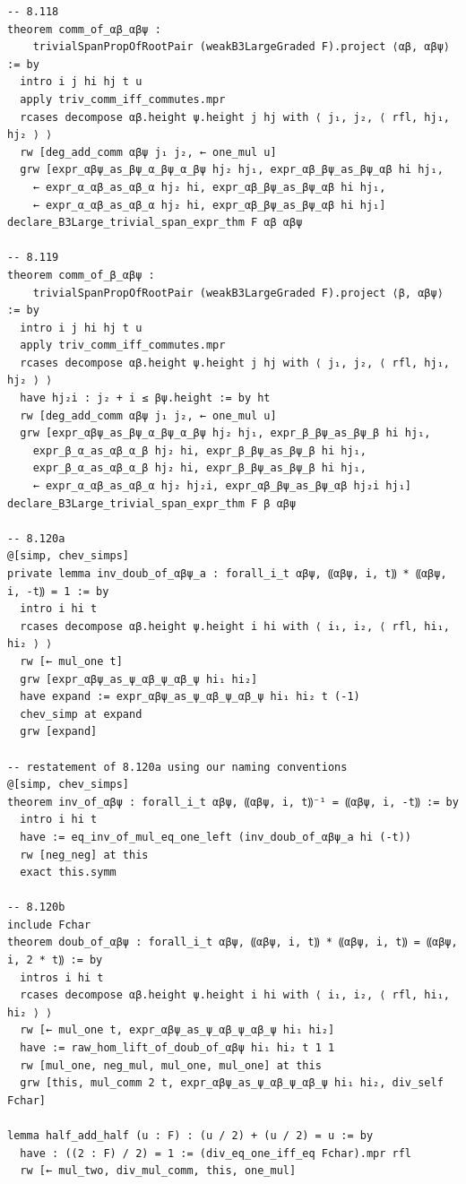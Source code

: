 \begin{Verbatim}
-- 8.118
theorem comm_of_αβ_αβψ :
    trivialSpanPropOfRootPair (weakB3LargeGraded F).project ⟨αβ, αβψ⟩ := by
  intro i j hi hj t u
  apply triv_comm_iff_commutes.mpr
  rcases decompose αβ.height ψ.height j hj with ⟨ j₁, j₂, ⟨ rfl, hj₁, hj₂ ⟩ ⟩
  rw [deg_add_comm αβψ j₁ j₂, ← one_mul u]
  grw [expr_αβψ_as_βψ_α_βψ_α_βψ hj₂ hj₁, expr_αβ_βψ_as_βψ_αβ hi hj₁,
    ← expr_α_αβ_as_αβ_α hj₂ hi, expr_αβ_βψ_as_βψ_αβ hi hj₁,
    ← expr_α_αβ_as_αβ_α hj₂ hi, expr_αβ_βψ_as_βψ_αβ hi hj₁]
declare_B3Large_trivial_span_expr_thm F αβ αβψ

-- 8.119
theorem comm_of_β_αβψ :
    trivialSpanPropOfRootPair (weakB3LargeGraded F).project ⟨β, αβψ⟩ := by
  intro i j hi hj t u
  apply triv_comm_iff_commutes.mpr
  rcases decompose αβ.height ψ.height j hj with ⟨ j₁, j₂, ⟨ rfl, hj₁, hj₂ ⟩ ⟩
  have hj₂i : j₂ + i ≤ βψ.height := by ht
  rw [deg_add_comm αβψ j₁ j₂, ← one_mul u]
  grw [expr_αβψ_as_βψ_α_βψ_α_βψ hj₂ hj₁, expr_β_βψ_as_βψ_β hi hj₁,
    expr_β_α_as_αβ_α_β hj₂ hi, expr_β_βψ_as_βψ_β hi hj₁,
    expr_β_α_as_αβ_α_β hj₂ hi, expr_β_βψ_as_βψ_β hi hj₁,
    ← expr_α_αβ_as_αβ_α hj₂ hj₂i, expr_αβ_βψ_as_βψ_αβ hj₂i hj₁]
declare_B3Large_trivial_span_expr_thm F β αβψ

-- 8.120a
@[simp, chev_simps]
private lemma inv_doub_of_αβψ_a : forall_i_t αβψ, ⸨αβψ, i, t⸩ * ⸨αβψ, i, -t⸩ = 1 := by
  intro i hi t
  rcases decompose αβ.height ψ.height i hi with ⟨ i₁, i₂, ⟨ rfl, hi₁, hi₂ ⟩ ⟩
  rw [← mul_one t]
  grw [expr_αβψ_as_ψ_αβ_ψ_αβ_ψ hi₁ hi₂]
  have expand := expr_αβψ_as_ψ_αβ_ψ_αβ_ψ hi₁ hi₂ t (-1)
  chev_simp at expand
  grw [expand]

-- restatement of 8.120a using our naming conventions
@[simp, chev_simps]
theorem inv_of_αβψ : forall_i_t αβψ, ⸨αβψ, i, t⸩⁻¹ = ⸨αβψ, i, -t⸩ := by
  intro i hi t
  have := eq_inv_of_mul_eq_one_left (inv_doub_of_αβψ_a hi (-t))
  rw [neg_neg] at this
  exact this.symm

-- 8.120b
include Fchar
theorem doub_of_αβψ : forall_i_t αβψ, ⸨αβψ, i, t⸩ * ⸨αβψ, i, t⸩ = ⸨αβψ, i, 2 * t⸩ := by
  intros i hi t
  rcases decompose αβ.height ψ.height i hi with ⟨ i₁, i₂, ⟨ rfl, hi₁, hi₂ ⟩ ⟩
  rw [← mul_one t, expr_αβψ_as_ψ_αβ_ψ_αβ_ψ hi₁ hi₂]
  have := raw_hom_lift_of_doub_of_αβψ hi₁ hi₂ t 1 1
  rw [mul_one, neg_mul, mul_one, mul_one] at this
  grw [this, mul_comm 2 t, expr_αβψ_as_ψ_αβ_ψ_αβ_ψ hi₁ hi₂, div_self Fchar]

lemma half_add_half (u : F) : (u / 2) + (u / 2) = u := by
  have : ((2 : F) / 2) = 1 := (div_eq_one_iff_eq Fchar).mpr rfl
  rw [← mul_two, div_mul_comm, this, one_mul]


\end{Verbatim}
